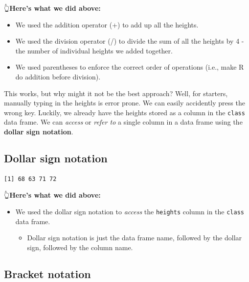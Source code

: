 \documentclass[
  letterpaper,
  DIV=11,
  numbers=noendperiod]{scrreprt}
\newenvironment{Shaded}{\begin{snugshade}}{\end{snugshade}}
\newcommand{\NormalTok}[1]{\textcolor[rgb]{0.00,0.23,0.31}{#1}}
\newcommand{\SpecialCharTok}[1]{\textcolor[rgb]{0.37,0.37,0.37}{#1}}
\providecommand{\tightlist}{%
  \setlength{\itemsep}{0pt}\setlength{\parskip}{0pt}}\usepackage{longtable,booktabs,array}
\begin{document}
👆\textbf{Here's what we did above:}

\begin{itemize}
\item
  We used the addition operator (+) to add up all the heights.
\item
  We used the division operator (/) to divide the sum of all the heights
  by 4 - the number of individual heights we added together.
\item
  We used parentheses to enforce the correct order of operations (i.e.,
  make R do addition before division).
\end{itemize}

This works, but why might it not be the best approach? Well, for
starters, manually typing in the heights is error prone. We can easily
accidently press the wrong key. Luckily, we already have the heights
stored as a column in the \texttt{class} data frame. We can
\emph{access} or \emph{refer to} a single column in a data frame using
the \textbf{dollar sign notation}.

\subsection{Dollar sign notation}\label{dollar-sign-notation}

\begin{Shaded}
\end{Shaded}

\begin{verbatim}
[1] 68 63 71 72
\end{verbatim}

👆\textbf{Here's what we did above:}

\begin{itemize}
\item
  We used the dollar sign notation to \emph{access} the \texttt{heights}
  column in the \texttt{class} data frame.

  \begin{itemize}
  \tightlist
  \item
    Dollar sign notation is just the data frame name, followed by the
    dollar sign, followed by the column name.
  \end{itemize}
\end{itemize}

\subsection{Bracket notation}\label{bracket-notation}
\end{document}
